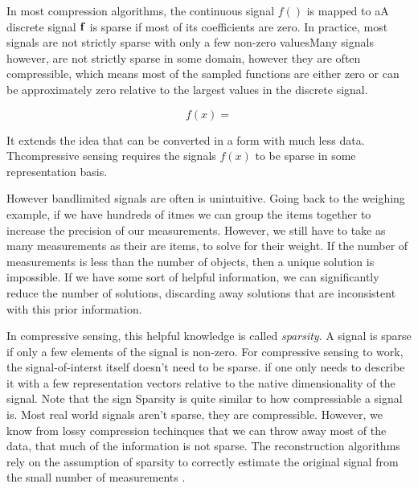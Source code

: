 In most compression algorithms, the continuous signal $f() $ is mapped to aA discrete signal $\mathbf{f}$ is sparse if most of its coefficients are zero. In practice, most signals are not strictly sparse 
with only a few non-zero valuesMany signals however, are not strictly sparse in some domain, however they are often \gls{compressible}, which means most of the sampled functions are either zero or can be approximately zero relative to the largest values in the discrete signal. 

\begin{equation}
f(x) = 
\end{equation}

It extends the idea that  can be converted in a form with much less data. Thcompressive sensing requires the signals $f(x)$ to be sparse in some \gls{representation basis}. 

However bandlimited signals are often is unintuitive. Going back to the weighing example, if we have hundreds of itmes we can group the items together to increase the precision of our measurements. However, we still have to take as many measurements as their are items, to solve for their weight. If the number of measurements is less than the number of objects, then a unique solution is impossible. If we have some sort of helpful information, we can significantly reduce the number of solutions, discarding away solutions that are inconsistent with this prior information. 

In compressive sensing, this helpful knowledge is called \emph{sparsity}. A signal is sparse if only a few elements of the signal is non-zero. For compressive sensing to work, the signal-of-interst itself doesn't need to be sparse.  if one only needs to describe it with a few representation vectors relative to the native dimensionality of the signal. Note that the sign  Sparsity is quite similar to how compressiable a signal is. Most real world signals aren't sparse, they are compressible. However, we know from lossy compression techinques that we can throw away most of the data, that much of the information is not sparse. The reconstruction algorithms rely on the assumption of sparsity to correctly estimate the original signal from the small number of measurements \cite{}.

